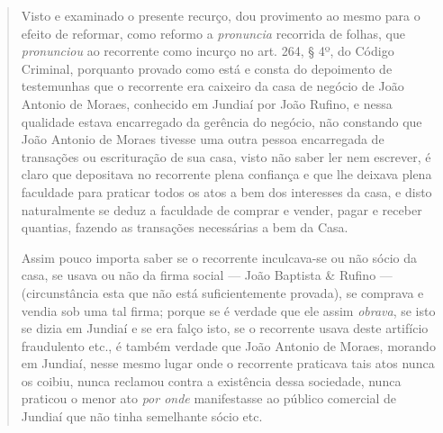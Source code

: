 \begin{quote}
Visto e examinado o presente recurço, dou provimento ao mesmo para o
efeito de reformar, como reformo a \emph{pronuncia} recorrida de folhas,
que \emph{pronunciou} ao recorrente como incurço no art. 264, § 4º, do
Código Criminal, porquanto provado como está e consta do depoimento de
testemunhas que o recorrente era caixeiro da casa de negócio de João
Antonio de Moraes, conhecido em Jundiaí por João Rufino, e nessa
qualidade estava encarregado da gerência do negócio, não constando que
João Antonio de Moraes tivesse uma outra pessoa encarregada de
transações ou escrituração de sua casa, visto não saber ler nem
escrever, é claro que depositava no recorrente plena confiança e que lhe
deixava plena faculdade para praticar todos os atos a bem dos interesses
da casa, e disto naturalmente se deduz a faculdade de comprar e vender,
pagar e receber quantias, fazendo as transações necessárias a bem da
Casa.

Assim pouco importa saber se o recorrente inculcava-se ou não sócio da
casa, se usava ou não da firma social --- João Baptista \& Rufino ---
(circunstância esta que não está suficientemente provada), se comprava e
vendia sob uma tal firma; porque se é verdade que ele assim
\emph{obrava}, se isto se dizia em Jundiaí e se era falço isto, se o
recorrente usava deste artifício fraudulento etc., é também verdade que
João Antonio de Moraes, morando em Jundiaí, nesse mesmo lugar onde o
recorrente praticava tais atos nunca os coibiu, nunca reclamou contra a
existência dessa sociedade, nunca praticou o menor ato \emph{por onde}
manifestasse ao público comercial de Jundiaí que não tinha semelhante
sócio etc.


\end{quote}
